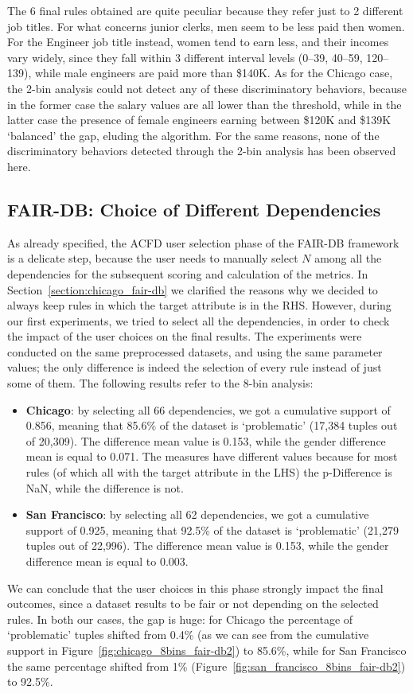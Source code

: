 \begin{itemize}
The 6 final rules obtained are quite peculiar because they refer just to 2 different job titles. For what concerns junior clerks, men seem to be less paid then women. For the Engineer job title instead, women tend to earn less, and their incomes vary widely, since they fall within 3 different interval levels (0--39, 40--59, 120--139), while male engineers are paid more than \$140K. As for the Chicago case, the 2-bin analysis could not detect any of these discriminatory behaviors, because in the former case the salary values are all lower than the threshold, while in the latter case the presence of female engineers earning between \$120K and \$139K `balanced' the gap, eluding the algorithm. For the same reasons, none of the discriminatory behaviors detected through the 2-bin analysis has been observed here.
\end{itemize} 


\subsection{FAIR-DB: Choice of Different Dependencies}
\label{section:fair-db_choice_different_dependencies}
As already specified, the ACFD user selection phase of the FAIR-DB framework is a delicate step, because the user needs to manually select \(N\) among all the dependencies for the subsequent scoring and calculation of the metrics. In Section~\ref{section:chicago_fair-db} we clarified the reasons why we decided to always keep rules in which the target attribute is in the RHS. However, during our first experiments, we tried to select all the dependencies, in order to check the impact of the user choices on the final results. The experiments were conducted on the same preprocessed datasets, and using the same parameter values; the only difference is indeed the selection of every rule instead of just some of them. The following results refer to the 8-bin analysis:
\begin{itemize}
\item \textbf{Chicago}: by selecting all 66 dependencies, we got a cumulative support of 0.856, meaning that 85.6\% of the dataset is `problematic' (17,384 tuples out of 20,309). The difference mean value is 0.153, while the gender difference mean is equal to 0.071. The measures have different values because for most rules (of which all with the target attribute in the LHS) the p-Difference is NaN, while the difference is not.
\item \textbf{San Francisco}: by selecting all 62 dependencies, we got a cumulative support of 0.925, meaning that 92.5\% of the dataset is `problematic' (21,279 tuples out of 22,996). The difference mean value is 0.153, while the gender difference mean is equal to 0.003.
\end{itemize}
We can conclude that the user choices in this phase strongly impact the final outcomes, since a dataset results to be fair or not depending on the selected rules. In both our cases, the gap is huge: for Chicago the percentage of `problematic' tuples shifted from 0.4\% (as we can see from the cumulative support in Figure~\ref{fig:chicago_8bins_fair-db2}) to 85.6\%, while for San Francisco the same percentage shifted from 1\% (Figure~\ref{fig:san_francisco_8bins_fair-db2}) to 92.5\%.



